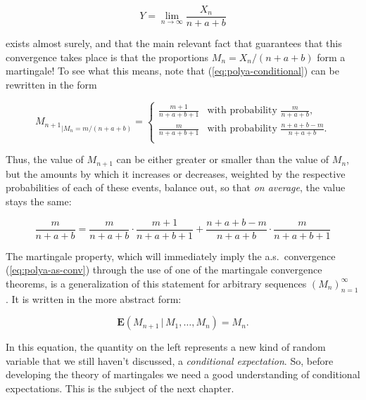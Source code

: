 \begin{equation*} \tag{4}\label{eq:polya-as-conv}
Y = \lim_{n\to\infty} \frac{X_n}{n+a+b}
\end{equation*}

\noindent exists almost surely, and that the main relevant fact
that guarantees that this convergence takes place is
that the proportions $M_n = X_n/(n+a+b)$ form a
martingale! To see what this means, note that
(\ref{eq:polya-conditional}) can be rewritten in the form

\[
{M_{n+1}}_{\big| M_n = m/(n+a+b)} =
\begin{cases}
\frac{m+1}{n+a+b+1} & \textrm{with probability }\frac{m}{n+a+b}, \\
\frac{m}{n+a+b+1} & \textrm{with probability }\frac{n+a+b-m}{n+a+b}. \\
\end{cases}
\]

\noindent Thus, the value of $M_{n+1}$ can be either greater or
smaller than the value of $M_n$, but the amounts by
which it increases or decreases, weighted by the
respective probabilities of each of these events,
balance out, so that \emph{on average}, the value stays the
same:

\[
\frac{m}{n+a+b} = \frac{m}{n+a+b}\cdot \frac{m+1}{n+a+b+1} +
\frac{n+a+b-m}{n+a+b} \cdot \frac{m}{n+a+b+1}
\]

\noindent The martingale property, which will immediately imply
the a.s.\ convergence (\ref{eq:polya-as-conv}) through the
use of one of the martingale convergence theorems, is
a generalization of this statement for arbitrary
sequences $(M_n)_{n=1}^\infty$. It is written in the
more abstract form:

\[
\mathbf{E}\left(M_{n+1}\,|\,M_1,\ldots,M_n\right) = M_n.
\]

\noindent In this equation, the quantity on the left represents
a new kind of random variable that we still haven't
discussed, a \emph{conditional expectation}. So, before
developing the theory of martingales we need a good
understanding of conditional expectations. This is the
subject of the next chapter.